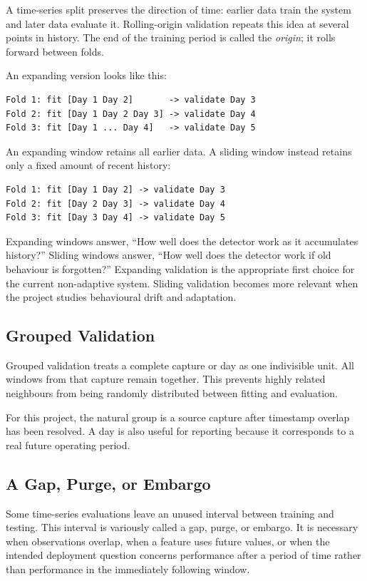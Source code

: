 \documentclass[11pt,a4paper]{article}
\begin{document}
A time-series split preserves the direction of time: earlier data train the
system and later data evaluate it. Rolling-origin validation repeats this idea
at several points in history. The end of the training period is called the
\emph{origin}; it rolls forward between folds.

An expanding version looks like this:

\begin{verbatim}
Fold 1: fit [Day 1 Day 2]       -> validate Day 3
Fold 2: fit [Day 1 Day 2 Day 3] -> validate Day 4
Fold 3: fit [Day 1 ... Day 4]   -> validate Day 5
\end{verbatim}

An expanding window retains all earlier data. A sliding window instead retains
only a fixed amount of recent history:

\begin{verbatim}
Fold 1: fit [Day 1 Day 2] -> validate Day 3
Fold 2: fit [Day 2 Day 3] -> validate Day 4
Fold 3: fit [Day 3 Day 4] -> validate Day 5
\end{verbatim}

Expanding windows answer, ``How well does the detector work as it accumulates
history?'' Sliding windows answer, ``How well does the detector work if old
behaviour is forgotten?'' Expanding validation is the appropriate first choice
for the current non-adaptive system. Sliding validation becomes more relevant
when the project studies behavioural drift and adaptation.

\subsection{Grouped Validation}

Grouped validation treats a complete capture or day as one indivisible unit.
All windows from that capture remain together. This prevents highly related
neighbours from being randomly distributed between fitting and evaluation.

For this project, the natural group is a source capture after timestamp overlap
has been resolved. A day is also useful for reporting because it corresponds to
a real future operating period.

\subsection{A Gap, Purge, or Embargo}

Some time-series evaluations leave an unused interval between training and
testing. This interval is variously called a gap, purge, or embargo. It is
necessary when observations overlap, when a feature uses future values, or when
the intended deployment question concerns performance after a period of time
rather than performance in the immediately following window.
\end{document}
